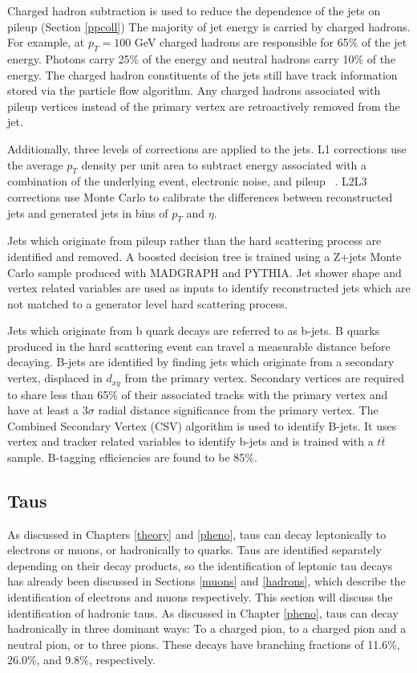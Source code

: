 \documentclass[oneside, letterpaper, oldfontcommands]{memoir}
\begin{document}
\qquad Charged hadron subtraction is used to reduce the dependence of the jets on pileup (Section \ref{ppcoll}) The majority of jet energy is carried by charged hadrons. For example, at $p_{T} = 100$ GeV charged hadrons are responsible for 65$\%$ of the jet energy. Photons carry 25$\%$ of the energy and neutral hadrons carry 10$\%$ of the energy. The charged hadron constituents of the jets still have track information stored via the particle flow algorithm. Any charged hadrons associated with pileup vertices instead of the primary vertex are retroactively removed from the jet.~\cite{Kirschenmann:1627818}

\qquad Additionally, three levels of corrections are applied to the jets. L1 corrections use the average $p_{T}$ density per unit area to subtract energy associated with a combination of the underlying event, electronic noise, and pileup ~\cite{Kirschenmann:1627818}.
L2L3 corrections use Monte Carlo to calibrate the differences between reconstructed jets and generated jets in bins of $p_{T}$ and $\eta$. 

\qquad Jets which originate from pileup rather than the hard scattering process are identified and removed. A boosted decision tree is trained using a Z+jets Monte Carlo sample produced with MADGRAPH and PYTHIA. Jet shower shape and vertex related variables are used as inputs to identify reconstructed jets which are not matched to a generator level hard scattering process. \cite{CMS-PAS-JME-13-005} 

\qquad Jets which originate from b quark decays are referred to as b-jets. B quarks produced in the hard scattering event can travel a measurable distance before decaying. B-jets are identified by finding jets which originate from a secondary vertex, displaced in $d_{xy}$ from the primary vertex. Secondary vertices are required to share less than 65\% of their associated tracks with the primary vertex and have at least a 3$\sigma$ radial distance significance from the primary vertex. The Combined Secondary Vertex (CSV) algorithm is used to identify B-jets. It uses vertex and tracker related variables to identify b-jets and is trained with a $t\bar{t}$ sample. B-tagging efficiencies are found to be 85\%. \cite{Chatrchyan:2012jua}

\subsection{Taus}\label{taus}

\qquad As discussed in Chapters \ref{theory} and \ref{pheno}, taus can decay leptonically to electrons or muons, or hadronically to quarks. Taus are identified separately depending on their decay products, so the identification of leptonic tau decays has already been discussed in Sections \ref{muons} and \ref{hadrons}, which describe the identification of electrons and muons respectively. This section will discuss the identification of hadronic taus. As discussed in Chapter \ref{pheno}, taus can decay hadronically in three dominant ways: To a charged pion, to a charged pion and a neutral pion, or to three pions. These decays have branching fractions of 11.6\%, 26.0\%, and 9.8\%, respectively.
\end{document}
